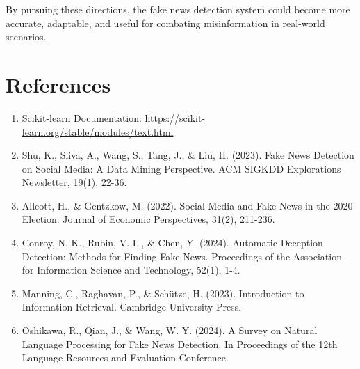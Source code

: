 \documentclass[12pt]{article}
\begin{document}
By pursuing these directions, the fake news detection system could become more accurate, adaptable, and useful for combating misinformation in real-world scenarios.

\section{References}
\begin{enumerate}
    \item Scikit-learn Documentation: \url{https://scikit-learn.org/stable/modules/text.html}
    \item Shu, K., Sliva, A., Wang, S., Tang, J., \& Liu, H. (2023). Fake News Detection on Social Media: A Data Mining Perspective. ACM SIGKDD Explorations Newsletter, 19(1), 22-36.
    \item Allcott, H., \& Gentzkow, M. (2022). Social Media and Fake News in the 2020 Election. Journal of Economic Perspectives, 31(2), 211-236.
    \item Conroy, N. K., Rubin, V. L., \& Chen, Y. (2024). Automatic Deception Detection: Methods for Finding Fake News. Proceedings of the Association for Information Science and Technology, 52(1), 1-4.
    \item Manning, C., Raghavan, P., \& Schütze, H. (2023). Introduction to Information Retrieval. Cambridge University Press.
    \item Oshikawa, R., Qian, J., \& Wang, W. Y. (2024). A Survey on Natural Language Processing for Fake News Detection. In Proceedings of the 12th Language Resources and Evaluation Conference.
\end{enumerate}
\end{document}
